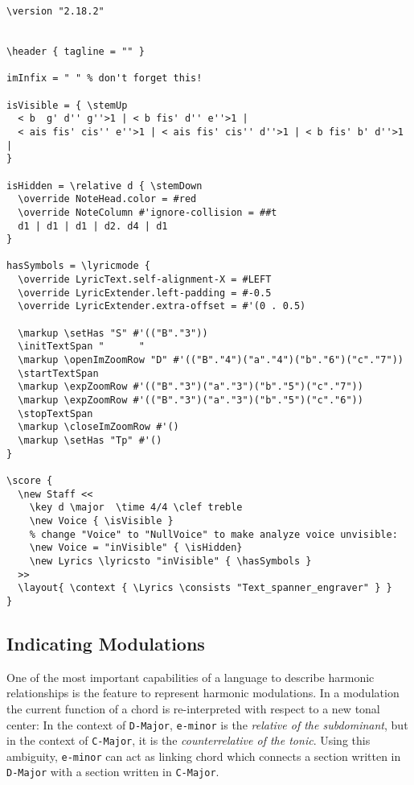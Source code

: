 \documentclass[
  DIV=calc,
  BCOR=5mm,
  12pt,
  headings=small,
  oneside,
  abstract=true,
  toc=bib,
  xcolor=dvipsnames,
  openany,
  ngerman,english]{scrartcl}
\newcommand{\acc}[0]{\textit}
\begin{document}
\begin{scriptsize}
\begin{verbatim}
\version "2.18.2"


\header { tagline = "" }

imInfix = " " % don't forget this!

isVisible = { \stemUp 
  < b  g' d'' g''>1 | < b fis' d'' e''>1 | 
  < ais fis' cis'' e''>1 | < ais fis' cis'' d''>1 | < b fis' b' d''>1 |
}

isHidden = \relative d { \stemDown 
  \override NoteHead.color = #red
  \override NoteColumn #'ignore-collision = ##t
  d1 | d1 | d1 | d2. d4 | d1
}

hasSymbols = \lyricmode {
  \override LyricText.self-alignment-X = #LEFT
  \override LyricExtender.left-padding = #-0.5
  \override LyricExtender.extra-offset = #'(0 . 0.5)

  \markup \setHas "S" #'(("B"."3"))
  \initTextSpan "      "
  \markup \openImZoomRow "D" #'(("B"."4")("a"."4")("b"."6")("c"."7"))
  \startTextSpan
  \markup \expZoomRow #'(("B"."3")("a"."3")("b"."5")("c"."7")) 
  \markup \expZoomRow #'(("B"."3")("a"."3")("b"."5")("c"."6")) 
  \stopTextSpan 
  \markup \closeImZoomRow #'()    
  \markup \setHas "Tp" #'() 
}

\score {
  \new Staff <<
    \key d \major  \time 4/4 \clef treble
    \new Voice { \isVisible }
    % change "Voice" to "NullVoice" to make analyze voice unvisible:
    \new Voice = "inVisible" { \isHidden}
    \new Lyrics \lyricsto "inVisible" { \hasSymbols }
  >>
  \layout{ \context { \Lyrics \consists "Text_spanner_engraver" } }
} 

\end{verbatim}
\end{scriptsize}

\subsection{Indicating Modulations}

One of the most important capabilities of a language to describe harmonic
relationships is the feature to represent harmonic modulations. In a modulation
the current function of a chord is re-interpreted with respect to a new tonal
center: In the context of \texttt{D-Major}, \texttt{e-minor} is the
\acc{relative of the subdominant}, but in the context of \texttt{C-Major}, it is
the \acc{counterrelative of the tonic}. Using this ambiguity, \texttt{e-minor}
can act as linking chord which connects a section written in \texttt{D-Major}
with a section written in \texttt{C-Major}.
\end{document}
